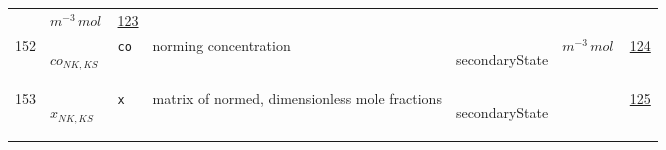 \begin{longtable}{|p{1cm}|p{2.5cm}|p{4.5cm}|p{8cm}|p{3.0cm}|p{3cm}|p{1cm}|}
             & $ m^{-3} \,mol \, $
             & \hyperlink{"e:123"}{ 123 }
                 \\
    152
             & \hypertarget{"v:152"}{ $ {co}{_{{N K}, {K S}}} $}
             & \verb|co|
             & norming concentration
             & \begin{lay}secondaryState \end{lay}
             & $ m^{-3} \,mol \, $
             & \hyperlink{"e:124"}{ 124 }
                 \\
    153
             & \hypertarget{"v:153"}{ $ {x}{_{{N K}, {K S}}} $}
             & \verb|x|
             & matrix of normed, dimensionless mole fractions 
             & \begin{lay}secondaryState \end{lay}
             & $  $
             & \hyperlink{"e:125"}{ 125 }
                 \\
    \end{longtable}